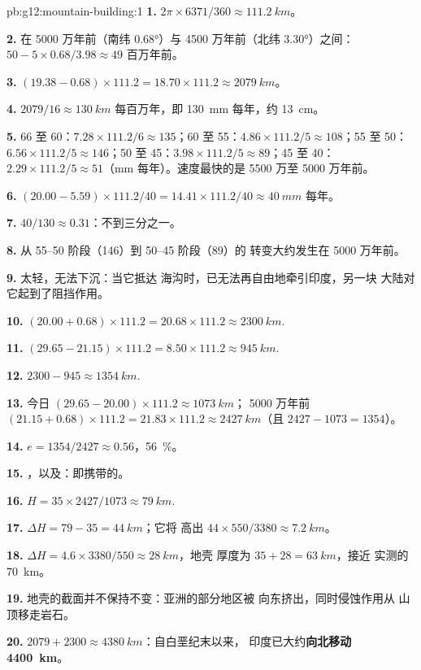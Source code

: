 \begin{solution}{pb:g12:mountain-building:1}
\textbf{1.} $2\pi \times 6371/360 \approx \qty{111.2}{km}$。

\textbf{2.} 在 5000 万年前（南纬 \ang{0.68}）与 4500 万年前（北纬 \ang{3.30}）之间：
$50 - 5 \times 0.68/3.98 \approx 49$ 百万年前。

\textbf{3.} $(19.38 - 0.68) \times 111.2 = 18.70 \times 111.2 \approx
\qty{2079}{km}$。

\textbf{4.} $2079/16 \approx \qty{130}{km}$ 每百万年，即 \qty{130}{mm}
每年，约 \qty{13}{cm}。

\textbf{5.} 66 至 60：$7.28 \times 111.2/6 \approx 135$；60 至 55：$4.86
\times 111.2/5 \approx 108$；55 至 50：$6.56 \times 111.2/5 \approx 146$；50
至 45：$3.98 \times 111.2/5 \approx 89$；45 至 40：$2.29 \times 111.2/5
\approx 51$（\unit{mm} 每年）。速度最快的是 5500 万至 5000 万年前。

\textbf{6.} $(20.00 - 5.59) \times 111.2/40 = 14.41 \times 111.2/40 \approx
\qty{40}{mm}$ 每年。

\textbf{7.} $40/130 \approx 0.31$：不到三分之一。

\textbf{8.} 从 55--50 阶段（146）到 50--45 阶段（89）的
转变大约发生在 5000 万年前。

\textbf{9.} 太轻，无法下沉：当它抵达
海沟时，已无法再自由地牵引印度，另一块
大陆对它起到了阻挡作用。

\textbf{10.} $(20.00 + 0.68) \times 111.2 = 20.68 \times 111.2 \approx
\qty{2300}{km}$.

\textbf{11.} $(29.65 - 21.15) \times 111.2 = 8.50 \times 111.2 \approx
\qty{945}{km}$.

\textbf{12.} $2300 - 945 \approx \qty{1354}{km}$.

\textbf{13.} 今日 $(29.65 - 20.00) \times 111.2 \approx \qty{1073}{km}$；
5000 万年前 $(21.15 + 0.68) \times 111.2 = 21.83 \times 111.2
\approx \qty{2427}{km}$（且 $2427 - 1073 = 1354$）。

\textbf{14.} $e = 1354/2427 \approx 0.56$，\qty{56}{\percent}。

\textbf{15.} ，以及：即携带的。

\textbf{16.} $H = 35 \times 2427/1073 \approx \qty{79}{km}$.

\textbf{17.} $\Delta H = 79 - 35 = \qty{44}{km}$；它将
高出 $44 \times 550/3380 \approx \qty{7.2}{km}$。

\textbf{18.} $\Delta H = 4.6 \times 3380/550 \approx \qty{28}{km}$，地壳
厚度为 $35 + 28 = \qty{63}{km}$，接近
实测的 \qty{70}{km}。

\textbf{19.} 地壳的截面并不保持不变：亚洲的部分地区被
向东挤出，同时侵蚀作用从
山顶移走岩石。

\textbf{20.} $2079 + 2300 \approx \qty{4380}{km}$：自白垩纪末以来，
印度已大约\textbf{向北移动 \qty{4400}{km}}。
\end{solution}

